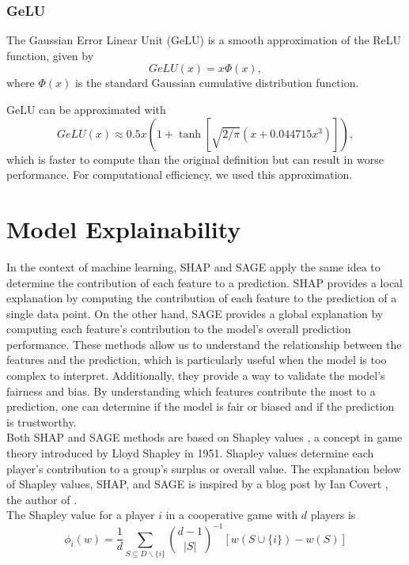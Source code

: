 \subsubsection{GeLU}
The Gaussian Error Linear Unit (GeLU) is a smooth approximation of the ReLU function, given by
\begin{equation}
    GeLU(x) = x \Phi (x),
\end{equation}
where $\Phi(x)$ is the standard Gaussian cumulative distribution function.

GeLU can be approximated with
\begin{equation}
    GeLU(x) \approx 0.5x \left( 1+\tanh\left[\sqrt{2/\pi}(x+0.044715x^3)\right] \right),
\end{equation}
which is faster to compute than the original definition but can result in worse performance.
For computational efficiency, we used this approximation.


\section{Model Explainability}\label{sec:model_explainability}
In the context of machine learning, SHAP \cite{SHAP} and SAGE \cite{SAGE} apply the same idea to determine the contribution of each feature to a prediction.
SHAP provides a local explanation by computing the contribution of each feature to the prediction of a single data point.
On the other hand, SAGE provides a global explanation by computing each feature's contribution to the model's overall prediction performance.
These methods allow us to understand the relationship between the features and the prediction, which is particularly useful when the model is too complex to interpret.
Additionally, they provide a way to validate the model's fairness and bias.
By understanding which features contribute the most to a prediction, one can determine if the model is fair or biased and if the prediction is trustworthy.\\

Both SHAP and SAGE methods are based on Shapley values \cite{shapleyvalue1953}, a concept in game theory introduced by Lloyd Shapley in 1951.
Shapley values determine each player's contribution to a group's surplus or overall value.
The explanation below of Shapley values, SHAP, and SAGE is inspired by a blog post by Ian Covert \cite{covertshapsage}, the author of \cite{SAGE}.\\

The Shapley value for a player $i$ in a cooperative game with $d$ players is
\begin{equation}
    \phi_i(w) = \frac{1}{d} \sum_{S \subseteq D \backslash \{ i \} } \binom{d-1}{|S|}^{-1} \left[ w(S\cup \{ i \} ) - w(S) \right]
\end{equation}

